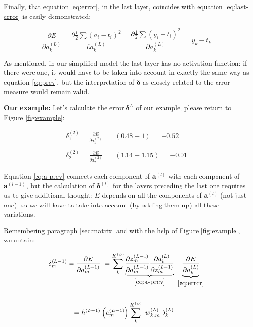 \documentclass{article}
\begin{document}
Finally, that equation \eqref{eq:error}, in the last layer, coincides with equation \eqref{eq:last-error} is easily demonstrated:

\begin{equation*}
\frac{\partial E}{\partial a_{k}^{( L)}}
=\frac{\partial \frac{1}{2}\sum ( a_{i} -t_{i})^{2}}{\partial a_{k}^{( L)}}
=\frac{\partial \frac{1}{2}\sum ( y_{i} -t_{i})^{2}}{\partial a_{k}^{( L)}}
=\ y_{k} -t_{k}
\end{equation*}


\begin{tcolorbox}[colback=gray!10, colframe=gray!50, title=Please note:]
As mentioned, in our simplified model the last layer has no activation function: if there were one, it would have to be taken into account in exactly the same way as equation \eqref{eq:prev}, but the interpretation of $\boldsymbol{\delta}$ as closely related to the error measure would remain valid.
\end{tcolorbox}

\textbf{Our example:} Let's calculate the error $\boldsymbol{\delta}^{L}$ of our example, please return to Figure \ref{fig:example}:


\begin{gather*}
\delta _{1}^{( 2)} =\frac{\partial E}{\partial a_{1}^{( 2)}} \ =\ ( 0.48-1) \ =-0.52\ \ \\
\\
\delta _{2}^{( 2)} =\frac{\partial E}{\partial a_{2}^{( 2)}} \ =\ ( 1.14-1.15) \ =-0.01
\end{gather*}

\begin{center}\textleaf\end{center}


Equation \eqref{eq:a-prev} connects each component of $\boldsymbol{a}^{(l)}$ with each component of $\boldsymbol{a}^{(l-1)}$, but the calculation of $\boldsymbol{\delta}^{(l)}$ for the layers preceding the last one requires us to give additional thought: $E$ depends on all the components of $\boldsymbol{a}^{(l)}$ (not just one), so we will have to take into account (by adding them up) all these variations.

Remembering paragraph \ref{sec:matrix} and with the help of Figure \ref{fig:example}, we obtain:

\begin{gather*}
\delta _{m}^{( L-1)} =\frac{\partial E}{\partial a_{m}^{( L-1)}} \ =\sum _{k}^{K^{( L)}}
\underbrace{\frac{\partial z_{m}^{( L-1)}}{\partial a_{m}^{( L-1)}}\frac{\partial a_{k}^{( L)}}{\partial z_{m}^{( L-1)}}}_{\eqref{eq:a-prev}} \
\underbrace{\frac{\partial E}{\partial a_{k}^{( L)}}}_{\eqref{eq:error}}\\
\\
=\dot{h}^{( L-1)}\left( a_{m}^{( L-1)}\right)\sum _{k}^{K^{( L)}} \ w_{k,m}^{( L)} \ \delta _{k}^{( L)} \ \ \\
\end{gather*}
\end{document}
